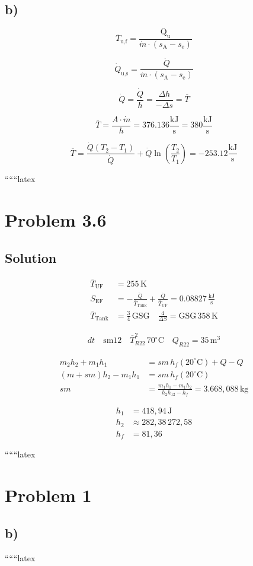 

\subsection*{b)}

\[
\overline{T}_{\text{u,f}} = \frac{\text{Q}_{\text{u}}}{\dot{m} \cdot (s_{\text{A}} - s_{\text{e}})}
\]

\[
\dot{Q}_{\text{u,s}} = \frac{\dot{Q}}{\dot{m} \cdot (s_{\text{A}} - s_{\text{e}})}
\]

\[
\dot{Q} = \frac{\dot{Q}}{h} = \frac{\Delta h}{-\Delta s} = \overline{T}
\]

\[
\overline{T} = \frac{A \cdot \dot{m}}{h} = 376.136 \frac{\text{kJ}}{\text{s}} = 380 \frac{\text{kJ}}{\text{s}}
\]

\[
\overline{T} = \frac{\dot{Q} (T_2 - T_1)}{\dot{Q}} + \dot{Q} \ln \left( \frac{T_2}{T_1} \right) = -253.12 \frac{\text{kJ}}{\text{s}}
\]

``````latex


\section*{Problem 3.6}

\subsection*{Solution}

\begin{align*}
\overline{T}_{\text{UF}} &= 255 \, \text{K} \\
S_{\text{EF}} &= -\frac{\dot{Q}}{\overline{T}_{\text{Tank}}} + \frac{\dot{Q}}{\overline{T}_{\text{UF}}} = 0.08827 \, \frac{\text{kJ}}{\text{s}} \\
\overline{T}_{\text{Tank}} &= \frac{3}{4} \, \text{GSG} \quad \frac{4}{\Delta S} = \text{GSG} \, 358 \, \text{K}
\end{align*}

\begin{align*}
dt \quad \text{sm12} \quad \overline{T}_{R22}^2 \, 70^\circ \text{C} \quad Q_{R22} = 35 \, \text{m}^3
\end{align*}

\begin{align*}
m_2 h_2 + m_1 h_1 &= sm \, h_f (20^\circ \text{C}) + Q - Q \\
(m + sm) h_2 - m_1 h_1 &= sm \, h_f (20^\circ \text{C}) \\
sm &= \frac{m_1 h_1 - m_1 h_2}{h_2 h_{12} - h_f} = 3.668,088 \, \text{kg}
\end{align*}

\begin{align*}
h_1 &= 418,94 \, \text{J} \\
h_2 &\approx 282,38 \, 272,58 \\
h_f &= 81,36
\end{align*}

``````latex


\section*{Problem 1}



\subsection*{b)}

``````latex
